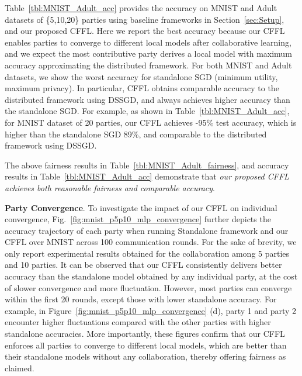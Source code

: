 \documentclass{article}
\begin{document}
Table~\ref{tbl:MNIST_Adult_acc} provides the accuracy on MNIST and Adult datasets of \{5,10,20\} parties using %
baseline frameworks in Section~\ref{sec:Setup}, and our proposed CFFL. %
Here we report the %
best accuracy because our CFFL enables parties to converge to different local models after collaborative learning, and we expect the most contributive party derives a local model with maximum accuracy approximating the distributed framework. %
For both MNIST and Adult datasets, we show the worst accuracy for standalone SGD (minimum utility, maximum privacy). In particular, CFFL obtains comparable accuracy to the distributed framework using DSSGD, and always achieves higher accuracy than the standalone SGD. For example, as shown in Table~\ref{tbl:MNIST_Adult_acc}, for MNIST dataset of 20 parties, our CFFL achieves -95\% test accuracy, which is higher than the standalone SGD 89\%, and comparable to the distributed framework using DSSGD. 
  
The above fairness results in Table~\ref{tbl:MNIST_Adult_fairness}, and accuracy results in Table~\ref{tbl:MNIST_Adult_acc} demonstrate that \emph{our proposed CFFL achieves both reasonable fairness and comparable accuracy}. 

\textbf{Party Convergence}. To investigate the impact of our CFFL on individual convergence, Fig.~\ref{fig:mnist_p5p10_mlp_convergence} %
further depicts the accuracy trajectory of each party when running Standalone framework and our CFFL %
over MNIST across 100 communication rounds. For the sake of brevity, we only report experimental results obtained for the collaboration among 5 parties and 10 parties. %
It can be observed that our CFFL consistently delivers better accuracy than the standalone model obtained by any individual party, at the cost of slower convergence and more fluctuation. However, most parties can converge within the first 20 rounds, except those with lower standalone accuracy. For example, in Figure~\ref{fig:mnist_p5p10_mlp_convergence} (d), party 1 and party 2 encounter higher fluctuations compared with the other parties with higher standalone accuracies. More importantly, these figures confirm that our CFFL enforces all parties to converge to different local models, which are better than their standalone models without any collaboration, thereby offering fairness as claimed. 
\end{document}
